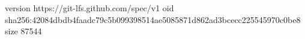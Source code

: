 version https://git-lfs.github.com/spec/v1
oid sha256:42084dbdb4faadc79c5b099398514ae5085871d862ad3bcecc225545970c0be8
size 87544
